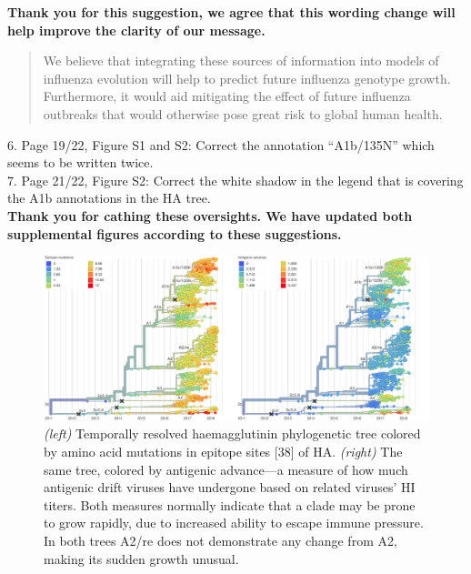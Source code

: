 \documentclass[11pt,oneside,letterpaper]{article}
\begin{document}
\textbf{Thank you for this suggestion, we agree that this wording change will help improve the clarity of our message.}

\begin{quotation}
  We believe that integrating these sources of information into models of influenza evolution will help to predict future influenza genotype growth.
  Furthermore, it would aid mitigating the effect of future influenza outbreaks that would otherwise pose great risk to global human health.
\end{quotation}

6. Page 19/22, Figure S1 and S2: Correct the annotation “A1b/135N” which seems to be written twice.\\

7. Page 21/22, Figure S2: Correct the white shadow in the legend that is covering the A1b annotations in the HA tree.\\

\textbf{Thank you for cathing these oversights. We have updated both supplemental figures according to these suggestions.}

\clearpage
\renewcommand{\thefigure}{S\arabic{figure}}

% 
\begin{figure}[t!]
    \begin{center}
    \includegraphics[width=\textwidth]{../manuscript/in-progress/texfiles/figures/epi_aa_trees_high_res.png}
    \end{center}
    \caption{\textit{(left)} Temporally resolved haemagglutinin phylogenetic tree colored by amino acid mutations in epitope sites [38] of HA. \textit{(right)} The same tree, colored by antigenic advance---a measure of how much antigenic drift viruses have undergone based on related viruses' HI titers. Both measures normally indicate that a clade may be prone to grow rapidly, due to increased ability to escape immune pressure. In both trees A2/re does not demonstrate any change from A2, making its sudden growth unusual.}
    \label{sup_fig:epitope_aa}
\end{figure}
\end{document}

